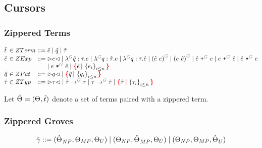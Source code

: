 \subsection{Cursors}


\subsubsection{Zippered Terms}

\[
  \arraycolsep=0pt
  \begin{array}{lcllll}
    \Z{t} & {}\in{} & ZTerm & {}::={} &
      \Z{e}
      \mid \Z{q}
      \mid \Z{\tau}
    \\
    \Z{e} & {}\in{} & ZExp & {}::={} &
      \cursor{e}
      \mid \eFun{G}{\Z{q}}{\tau}{e}
      \mid \eFun{G}{q}{\Z{\tau}}{e}
      \mid \eFun{G}{q}{\tau}{\Z{e}}
      \mid \eApp{G}{\Z{e}}{e}
      \mid \eApp{G}{e}{\Z{e}}
      \mid \ePlus{G}{\Z{e}}{e}
      \mid \ePlus{G}{e}{\Z{e}}
      \mid \eTimes{G}{\Z{e}}{e}
      \\
    &&&&
      \mid \eTimes{G}{e}{\Z{e}}
      \mid \conflictHole{\Z{e}, \SetOf{e_i}_{i \leq n}}
    \\
    \Z{q} & {}\in{} & ZPat & {}::={} &
      \cursor{q}
      \mid \conflictHole{\Z{q}, \SetOf{q_i}_{i \leq n}}
    \\
    \Z{\tau} & {}\in{} & ZTyp & {}::={} &
      \cursor{\tau}
      \mid \tArrow{G}{\Z{\tau}}{\tau}
      \mid \tArrow{G}{\tau}{\Z{\tau}}
      \mid \conflictHole{\Z{\tau}, \SetOf{\tau_i}_{i \leq n}}
    \\
  \end{array}
\]

Let $\hat{\Theta_{}} = (\Theta_{}, \hat{t})$ denote a set of terms paired with a zippered term.


\subsubsection{Zippered Groves}

\begin{gather*}
  \arraycolsep=0pt
  \begin{array}{lll}
    \Z{\gamma} & {}::={} &
      (\Z{\Set}_{NP}, \Set[MP], \Set[U])
      \mid (\Set[NP], \Z{\Set}_{MP}, \Set[U])
      \mid (\Set[NP], \Set[MP], \Z{\Set}_U)
  \end{array}
\end{gather*}

